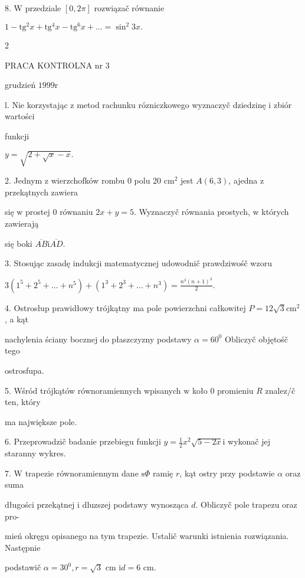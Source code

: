 \documentclass[a4paper,12pt]{article}
\begin{document}
8. $\mathrm{W}$ przedziale $[0,2\pi]$ rozwiązač równanie

$1-\mathrm{t}\mathrm{g}^{2}x+\mathrm{t}\mathrm{g}^{4}x-\mathrm{t}\mathrm{g}^{6}x+\ldots=\sin^{2}3x.$

2





PRACA KONTROLNA nr 3

grudzień $1999\mathrm{r}$

l. Nie korzystając $\mathrm{z}$ metod rachunku rózniczkowego wyznaczyč dziedzinę $\mathrm{i}$ zbiór wartości

funkcji

$y=\sqrt{2+\sqrt{x}-x}.$

2. Jednym $\mathrm{z}$ wierzchofków rombu $0$ polu 20 $\mathrm{c}\mathrm{m}^{2}$ jest $A(6,3)$, ajedna $\mathrm{z}$ przekątnych zawiera

się $\mathrm{w}$ prostej $0$ równaniu $2x+y=5$. Wyznaczyč równania prostych, $\mathrm{w}$ których zawierają

się boki $\overline{AB} \mathrm{i} \overline{AD}.$

3. Stosując zasadę indukcji matematycznej udowodnič prawdziwośč wzoru

$3(1^{5}+2^{5}+\displaystyle \ldots+n^{5})+(1^{3}+2^{3}+\ldots+n^{3})=\frac{n^{3}(n+1)^{3}}{2}.$

4. Ostrosłup prawidłowy trójkątny ma pole powierzchni całkowitej $P = 12\sqrt{3}\mathrm{c}\mathrm{m}^{2}$, a kąt

nachylenia ściany bocznej do płaszczyzny podstawy $\alpha = 60^{0}$ Obliczyč objętośč tego

ostrosfupa.

5. Wśród trójkątów równoramiennych wpisanych $\mathrm{w}$ koło $0$ promieniu $R$ znalez/č ten, który

ma największe pole.

6. Przeprowadzič badanie przebiegu funkcji $y=\displaystyle \frac{1}{2}x^{2}\sqrt{5-2x}\mathrm{i}$ wykonač jej staranny wykres.

7. $\mathrm{W}$ trapezie równoramiennym dane $\mathrm{s}\Phi$ ramię $r$, kąt ostry przy podstawie $\alpha$ oraz suma

długości przekątnej $\mathrm{i}$ dluzszej podstawy wynosząca $d$. Obliczyč pole trapezu oraz pro-

mień okręgu opisanego na tym trapezie. Ustalič warunki istnienia rozwiązania. Następnie

podstawič $\alpha=30^{0}, r=\sqrt{3}$ cm $\mathrm{i} d=6$ cm.
\end{document}
